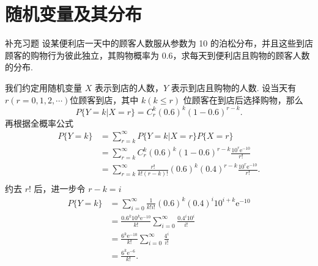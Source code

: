 \section{随机变量及其分布}

\begin{question}{补充习题}
    设某便利店一天中的顾客人数服从参数为 10 的泊松分布，并且这些到店顾客的购物行为彼此独立，其购物概率为 0.6，求每天到便利店且购物的顾客人数的分布.
\end{question}
\begin{solution}
    我们约定用随机变量 $X$ 表示到店的人数，$Y$ 表示到店且购物的人数. 设当天有 $r (r=0, 1, 2, \cdots)$位顾客到店，其中 $k (k \leqslant r)$ 位顾客在到店后选择购物，那么
    $$
        P\{Y=k|X=r\} = C_r^k(0.6)^k(1-0.6)^{r-k}.
    $$
    再根据全概率公式
    $$
        \begin{aligned}
            P\{Y=k\}
             & = \sum_{r=k}^{\infty} P\{Y=k|X=r\} P\{X=r\}                                                 \\
             & = \sum_{r=k}^{\infty} C_r^k(0.6)^k(1-0.6)^{r-k} \frac{10^r\mathrm{e}^{-10}}{r!}             \\
             & = \sum_{r=k}^{\infty} \frac{r!}{k!(r-k)!}(0.6)^k(0.4)^{r-k}\frac{10^r\mathrm{e}^{-10}}{r!}. \\
        \end{aligned}
    $$
    约去 $r!$ 后，进一步令 $r-k=i$
    $$
        \begin{aligned}
            P\{Y=k\}
             & = \sum_{i=0}^{\infty} \frac{1}{k!i!}(0.6)^k(0.4)^{i}10^{i+k}\mathrm{e}^{-10}  \\
             & = \frac{0.6^k10^k\mathrm{e}^{-10}}{k!}\sum_{i=0}^{\infty}\frac{0.4^i10^i}{i!} \\
             & = \frac{6^k\mathrm{e}^{-10}}{k!} \sum_{i=0}^{\infty}\frac{4^i}{i!}            \\
             & = \frac{6^k\mathrm{e}^{-6}}{k!}.
        \end{aligned}
    $$
\end{solution}

